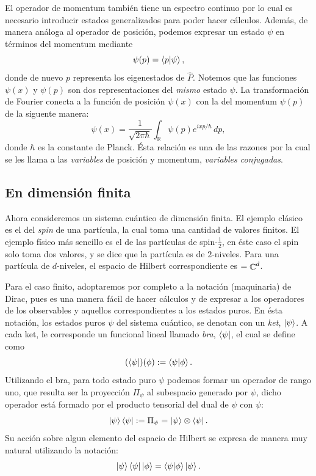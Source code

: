 \documentclass[a4paper]{report}
\DeclareMathOperator{\R}{\mathbb{R}}
\DeclareMathOperator{\C}{\mathbb{C}}
\let\H\relax
\DeclareMathOperator{\H}{\mathcal H}
\begin{document}
  El operador de momentum también tiene un espectro continuo
  por lo cual es necesario introducir estados generalizados
  para poder hacer cálculos. Además, de manera análoga al
  operador de posición, podemos expresar un estado $\psi$ en
  términos del momentum mediante
  \[
    \psi(p) = \braket{p| \psi},
  \] 
  donde de nuevo $p$ representa los eigenestados de $\hat
  P$. Notemos que las funciones $\psi(x)$ y $\psi(p)$ son
  dos representaciones del \textit{mismo} estado $\psi$.  La
  transformación de Fourier conecta a la función de posición
  $\psi(x)$ con la del momentum $\psi(p)$ de la siguente
  manera:
  \begin{equation}
    \psi(x)
    = \frac{1}{\sqrt{2\pi\hbar}} \int_{\R} \psi(p)e^{ixp /
    \hbar} \, dp,
  \end{equation} 
  donde $\hbar$ es la constante de Planck. Ésta relación es
  una de las razones por la cual se les llama a las
  \textit{variables} de posición y momentum,
  \textit{variables conjugadas}.  

  \subsection{En dimensión finita}

  Ahora consideremos un sistema cuántico de dimensión
  finita. El ejemplo clásico es el del \textit{spin} de una
  partícula, la cual toma una cantidad de valores finitos.
  El ejemplo físico más sencillo es el de las partículas de
  spin-$\frac{1}{2}$, en éste caso el spin solo toma dos
  valores, y se dice que la partícula es de $2$-niveles.
  Para una partícula de $d$-niveles, el espacio de Hilbert
  correspondiente es $\H  = \C^{d}$.

  Para el caso finito, adoptaremos por completo a la
  notación (maquinaria) de Dirac, pues es una manera fácil
  de hacer cálculos y de expresar a los operadores de los
  observables y aquellos correspondientes a los estados
  puros. En ésta notación, los estados puros $\psi$ del
  sistema cuántico, se denotan con un \textit{ket}, $\ket
  \psi$. A cada ket, le corresponde un funcional lineal
  llamado \textit{bra}, $\bra \psi$, el cual se define como
  \[
    (\bra \psi)(\phi)
    := \braket{\psi|\phi}.
  \] 
  Utilizando el bra, para todo estado puro $\psi$ podemos
  formar un operador de rango uno, que resulta ser la
  proyección $\Pi_\psi$ al subespacio generado por $\psi$,
  dicho operador está formado por el producto tensorial del
  dual de $\psi$ con $\psi$:
  \[
    \ket \psi \bra \psi
    := \Pi_\psi
    = \ket \psi \otimes \bra \psi.
  \] 
  Su acción sobre algun elemento del espacio de Hilbert se
  expresa de manera muy natural utilizando la notación:
  \[
    \ket \psi \bra \psi \ket \phi
    = \braket{\psi|\phi} \ket \psi.
  \] 
\end{document}
